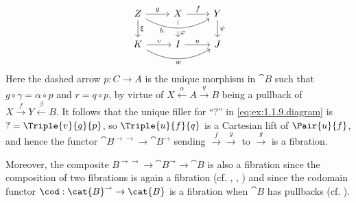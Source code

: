 \begin{solution}
\begin{equation*}
\begin{tikzcd}
Z \arrow[r, "g"] \arrow[d, "\xi"] & X \arrow[r, "f"] \arrow[d, near end, "\varphi"] & Y \arrow[d, "\psi"] \\
K \arrow[r, "v"] \arrow[rr, bend right, "w"{below}] & I \arrow[r, "u"] & J
\arrow[from=ull, to=u, bend right, crossing over, near start, "h"{below}]
\end{tikzcd}
\end{equation*}
Here the dashed arrow \(p : C \to A\) is the unique morphism in \(\cat{B}\) such that \(g \circ \gamma = \alpha \circ p\) and \(r = q \circ p\), by virtue of \(X \overset{\alpha}{\leftarrow} A \overset{q}{\rightarrow} B\) being a pullback of \(X \overset{f}{\to} Y \overset{\beta}{\leftarrow} B\).
It follows that the unique filler for ``\(?\)'' in \eqref{eq:ex:1.1.9.diagram} is \(? = \Triple{v}{g}{p}\), so \(\Triple{u}{f}{q}\) is a Cartesian lift of \(\Pair{u}{f}\), and hence the functor \(\cat{B}^{\rightarrow\rightarrow} \to \cat{B}^\rightarrow\) sending \(\overset{f}{\to}\overset{g}{\to}\) to \(\overset{g}{\to}\) is a fibration.

Moreover, the composite \(B^{\rightarrow\rightarrow} \to \cat{B}^{\rightarrow} \to \cat{B}\) is also a fibration since the composition of two fibrations is again a fibration (cf. \cite[Proposition~8.1.12]{MR1313497}, \cite[Proposition~3.7]{MR2222646}, \cite[Proposition~3.1]{MR0213413} \cite[Proposition~9.1.10]{MR4261588}) and since the codomain functor \(\cod : \cat{B}^{\rightarrow} \to \cat{B}\) is a fibration when \(\cat{B}\) has pullbacks (cf. \cite[Proposition~1.1.6]{MR1674451}).
\end{solution}